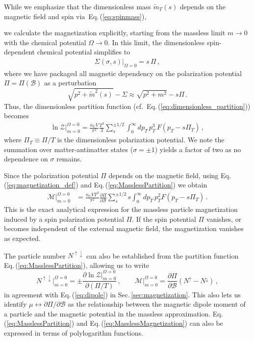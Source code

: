 \documentclass[epjST]{svjour}
\newcommand{\req}[1]{Eq.\,(\ref{#1})}
\newcommand{\rsec}[1]{Sec.\,{\ref{#1}}}
\begin{document}
While we emphasize that the dimensionless mass \(\tilde{m}_{T}(s)\) depends on the magnetic field and spin via~\req{eq:spinmass}, {\color{blue}we calculate the magnetization explicitly, starting from the massless limit \(m\to 0\) with the chemical potential \(\Omega\to0\). In this limit, the dimensionless spin-dependent chemical potential simplifies to
\begin{align}
\Sigma(\sigma,s)\vert_{\Omega=0} = s\,\Pi\,,
\end{align}
where we have packaged all magnetic dependency on the polarization potential \(\Pi=\Pi(\mathcal{B})\) as a perturbation
\begin{equation}
\sqrt{p^{2}+\tilde{m}^{2}(s)}-\Sigma\approx\sqrt{p^{2}+m^{2}}-s\Pi\,.
\end{equation}
Thus, the dimensionless partition function (cf.~\req{eq:dimensionless_partition}) becomes
\begin{align}
\label{eq:MasslessPartition}
\ln\mathcal{Z}\vert_{m=0}^{\Omega=0} 
= \frac{n_\mathrm{C} V}{\pi^{2}} \frac{T^{3}}{3} \sum_{s}^{\pm1/2}\int_{0}^{\infty} dp_{T} \, p_{T}^{3} \, F\left(p_{T} - s\Pi_{T}\right)\,,
\end{align}
where \(\Pi_{T}\equiv\Pi/T\) is the dimensionless polarization potential. We note the summation over matter-antimatter states (\(\sigma=\pm1\)) yields a factor of two as no dependence on \(\sigma\) remains.

Since the polarization potential \(\Pi\) depends on the magnetic field, using \req{eq:magnetization_def} and \req{eq:MasslessPartition} we obtain
\begin{align}
\label{eq:MasslessMagnetization}
\mathcal{M}\vert_{m=0}^{\Omega=0}  &= \frac{n_\mathrm{C}VT^{3}}{\pi^{2}}\frac{\partial\Pi}{\partial\mathcal{B}}\sum_{s}^{\pm 1/2}s\int_{0}^{\infty}dp_{T}\,p_{T}^{2}F\left(p_{T}-s\Pi_{T}\right)\,.
\end{align}
This is the exact analytical expression for the massless particle magnetization induced by a spin polarization potential \(\Pi\). If the spin potential \(\Pi\) vanishes, or becomes independent of the external magnetic field, the magnetization vanishes as expected.

The particle number \(N^{\uparrow\downarrow}\) can also be established from the partition function \req{eq:MasslessPartition}, allowing us to write
\begin{equation}
N^{\uparrow\downarrow}\vert_{m=0}^{\Omega=0} = \pm\frac{\partial\ln\mathcal{Z}\vert_{m=0}^{\Omega=0}}{\partial(\Pi/T)}\,,\qquad
\mathcal{M}\vert_{m=0}^{\Omega=0}  = \frac{\partial\Pi}{\partial\mathcal{B}}\left(N^{\uparrow}-N^{\downarrow}\right)\,,
\end{equation}
in agreement with \req{eq:dipole} in \rsec{sec:magnetization}. This also lets us identify \(\mu\leftrightarrow\partial\Pi/\partial\mathcal{B}\) as the relationship between the magnetic dipole moment of a particle and the magnetic potential in the massless approximation. \req{eq:MasslessPartition} and \req{eq:MasslessMagnetization} can also be expressed in terms of polylogarithm functions.

}
\end{document}

